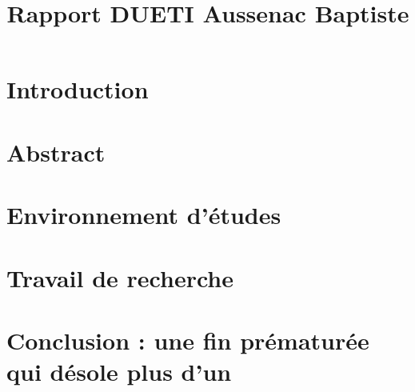 \documentclass{rapportECL}
\title{Rapport DUETI Aussenac Baptiste} %
\begin{document}




        
\fairemarges %
\fairepagedegarde %
\tabledematieres %




\section{Introduction} 



\newpage

\section{Abstract} 



\newpage

\section{Environnement d'études}


\newpage

\section{Travail de recherche}


\newpage

\section{Conclusion : une fin prématurée qui désole plus d'un}


\newpage
\end{document}
